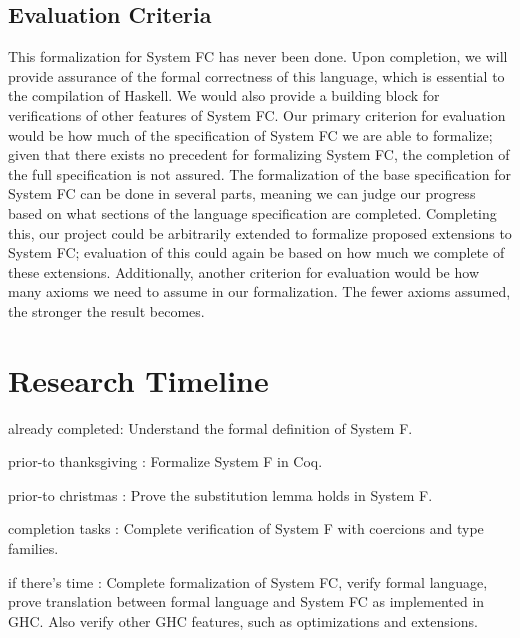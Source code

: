 \documentclass{sig-alternate}
\begin{document}
\subsection{Evaluation Criteria}
\label{subsec:eval_criteria}
This formalization for System FC has never been done. Upon completion, we will provide assurance of the formal correctness of this language, which is essential to the compilation of Haskell. We would also provide a building block for verifications of other features of System FC.
Our primary criterion for evaluation would be how much of the specification of System FC we are able to formalize; given that there exists no precedent for formalizing System FC, the completion of the full specification is not assured. The formalization of the base specification for System FC can be done in several parts, meaning we can judge our progress based on what sections of the language specification are completed. Completing this, our project could be arbitrarily extended to formalize proposed extensions to System FC; evaluation of this could again be based on how much we complete of these extensions. Additionally, another criterion for evaluation would be how many axioms we need to assume in our formalization. The fewer axioms assumed, the stronger the result becomes.

\section{Research Timeline}
\label{sec:research_timeline}
\begin{itemize*}
	\item {\sc already completed}: Understand the formal definition of System F.
	\item {\sc prior-to thanksgiving} : Formalize System F in Coq.
	\item {\sc prior-to christmas} : Prove the substitution lemma holds in System F.
	\item {\sc completion tasks} : Complete verification of System F with coercions and type families.
	\item {\sc if there's time} : Complete formalization of System FC, verify formal language, prove translation between formal language and System FC as implemented in GHC. Also verify other GHC features, such as optimizations and extensions.
\end{itemize*}


\vspace{175pt}
\end{document}
